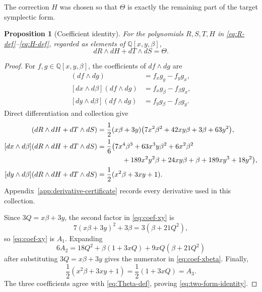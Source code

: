\documentclass[11pt]{article}
\newcommand{\Q}{\mathbb Q}
\newtheorem{proposition}[theorem]{Proposition}
\theoremstyle{remark}
\begin{document}
The correction \(H\) was chosen so that \(\Theta\) is exactly the remaining
part of the target symplectic form.

\begin{proposition}[Coefficient identity]\label{prop:coefficient-identity}
For the polynomials \(R,S,T,H\) in
\eqref{eq:R-def}--\eqref{eq:H-def}, regarded as elements of
\(\Q[x,y,\beta]\),
\begin{equation}\label{eq:two-form-identity}
  dR\wedge dH+dT\wedge dS=\Theta.
\end{equation}
\end{proposition}

\begin{proof}
For \(f,g\in\Q[x,y,\beta]\), the coefficients of \(df\wedge dg\) are
\begin{align*}
  [dx\wedge dy](df\wedge dg)&=f_xg_y-f_yg_x,\\
  [dx\wedge d\beta](df\wedge dg)&=f_xg_\beta-f_\beta g_x,\\
  [dy\wedge d\beta](df\wedge dg)&=f_yg_\beta-f_\beta g_y.
\end{align*}
Direct differentiation and collection give
\begin{align}
 [dx\wedge dy](dR\wedge dH+dT\wedge dS)
   &={\frac12}(x\beta+3y)
      \bigl(7x^2\beta^2+42xy\beta+3\beta+63y^2\bigr),
      \label{eq:coef-xy}\\
 [dx\wedge d\beta](dR\wedge dH+dT\wedge dS)
   &=\frac16\bigl(7x^4\beta^3+63x^3y\beta^2+6x^2\beta^2\notag\\
   &\hspace{1.25cm}+189x^2y^2\beta+24xy\beta+\beta
      +189xy^3+18y^2\bigr),
      \label{eq:coef-xbeta}\\
 [dy\wedge d\beta](dR\wedge dH+dT\wedge dS)
   &=\frac12(x^2\beta+3xy+1).
      \label{eq:coef-ybeta}
\end{align}
Appendix~\ref{app:derivative-certificate} records every derivative used in
this collection.

Since \(3Q=x\beta+3y\), the second factor in
\eqref{eq:coef-xy} is
\[
  7(x\beta+3y)^2+3\beta
  =3(\beta+21Q^2),
\]
so \eqref{eq:coef-xy} is \(A_1\).  Expanding
\[
  6A_2
  =18Q^2+\beta(1+3xQ)+9xQ(\beta+21Q^2)
\]
after substituting \(3Q=x\beta+3y\) gives the numerator in
\eqref{eq:coef-xbeta}.  Finally,
\[
  \frac12(x^2\beta+3xy+1)
  =\frac12(1+3xQ)=A_3.
\]
The three coefficients agree with \eqref{eq:Theta-def}, proving
\eqref{eq:two-form-identity}.
\end{proof}
\end{document}
